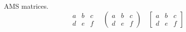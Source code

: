 \documentclass{article}
\begin{document}
AMS matrices.
\[
\begin{matrix}
 a & b & c \\
 d&e&f
 \end{matrix}
 \quad
 \begin{pmatrix}
 a & b & c \\
 d&e&f
 \end{pmatrix}
 \quad
 \begin{bmatrix}
 a & b & c \\
 d&e&f
 \end{bmatrix}
 \]
 
\end{document}
